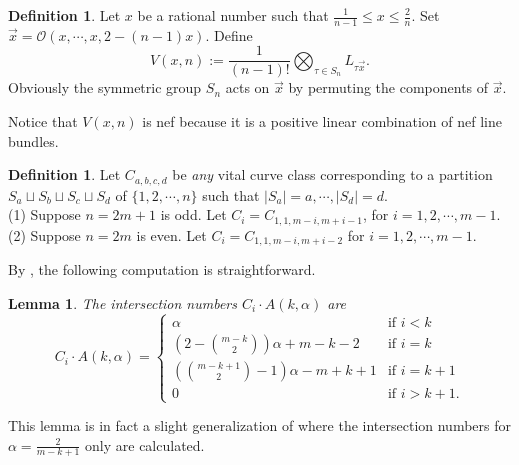 \documentclass[10pt]{amsart}
\newtheorem{lemma}[theorem]{Lemma}
\theoremstyle{definition}
\newtheorem{definition}[theorem]{Definition}
\newcommand{\cO}{\mathcal{O} }
\begin{document}
\begin{definition}\cite[Definition 2.3]{AlexSwin}\label{def-symnefdiv}
Let $x$ be a rational number such that $\frac{1}{n-1} \le x \le \frac{2}{n}$.
Set $\vec{x} = \cO(x, \cdots, x, 2-(n-1)x)$.
Define
\[
    V(x, n) := \frac{1}{(n-1)!}\bigotimes_{\tau \in S_n} L_{\tau
    \vec{x}}.
\]
Obviously the symmetric group $S_n$ acts on $\vec{x}$ by permuting
the components of $\vec{x}$.
\end{definition}
Notice that $V(x,n)$ is nef because it is a positive linear
combination of nef line bundles.

\begin{definition}\cite[Definition 3.5]{AlexSwin}
Let $C_{a,b,c,d}$ be \emph{any} vital curve class corresponding to
a partition $S_a \sqcup S_b \sqcup S_c \sqcup S_d$ of $\{1, 2,
\cdots, n\}$
such that $|S_a| = a, \cdots, |S_d|=d$.\\
(1) Suppose $n=2m+1$ is odd. Let $C_i = C_{1, 1, m-i, m+i-1}$,
for $i = 1, 2, \cdots, m-1$.\\
(2) Suppose $n=2m$ is even. Let $C_i = C_{1,1,m-i, m+i-2}$ for $i
= 1, 2, \cdots, m-1$.
\end{definition}

By \cite[Corollary 4.4]{KeelMcKer}, the following computation is straightforward.
\begin{lemma}\label{lem-intAkalpha}
The intersection numbers $C_i \cdot A(k, \alpha)$ are
\[
    C_i \cdot A(k, \alpha) = \left\{\begin{array}{ll}
    \alpha&\mbox{if } i < k\\
    \left(2-{m-k \choose 2}\right)\alpha + m-k-2&\mbox{if } i = k\\
    \left({m-k+1 \choose 2}-1\right)\alpha-m+k+1
    &\mbox{if } i = k+1\\
    0&\mbox{if } i > k+1.
    \end{array}\right.
\]
\end{lemma}

This lemma is in fact a slight generalization of \cite[Lemma
3.7]{AlexSwin} where the intersection numbers for
$\alpha=\frac{2}{m-k+1}$ only are calculated.
\end{document}
